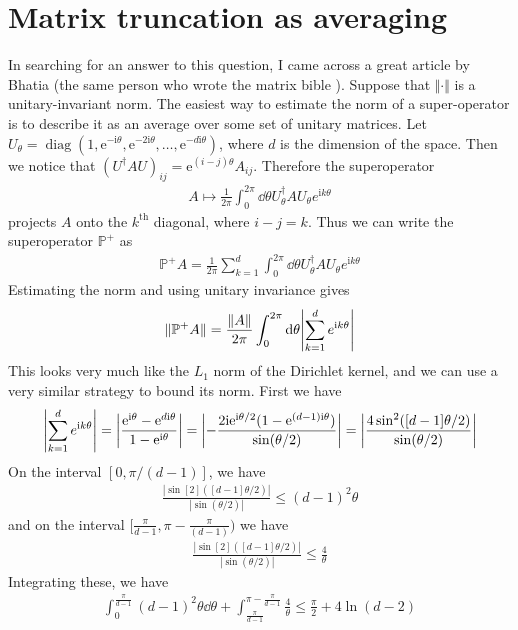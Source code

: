 \documentclass[11pt]{article}
\newcommand{\diag}{\operatorname{diag}}
\newcommand{\e}{\mathrm e}
\newcommand{\ii}{\mathrm i}
\begin{document}
\section{Matrix truncation as averaging}
In searching for an answer to this question, I came across a great article by
Bhatia \cite{bhatia} (the same person who wrote the matrix bible \cite{bible}).
Suppose that $\Vert \cdot \Vert$ is a unitary-invariant norm. The easiest way to
estimate the norm of a super-operator is to describe it as an average over some set of unitary matrices. Let $U_{\theta} = \diag(1, \e^{-\ii\theta}, \e^{-2\ii \theta}, \dots, \e^{-d\ii\theta})$, where $d$ is the dimension of the space. Then we notice that $(U^\dagger A U)_{ij} = \e^{(i-j)\theta}A_{ij}$. Therefore the superoperator
\begin{align}
    A \mapsto \frac{1}{2\pi}\int_{0}^{2\pi}\dd \theta U_{\theta}^\dagger A U_{\theta}e^{\ii k \theta}
\end{align}
projects $A$ onto the $k^{\text{th}}$ diagonal, where $i-j = k$. Thus we can write the superoperator $\mathbb P^+$ as
\begin{align}
    \mathbb P^+ A = \frac{1}{2\pi}\sum_{k = 1}^d\int_{0}^{2\pi}\dd \theta U_{\theta}^\dagger A U_{\theta}e^{\ii k \theta}
\end{align}
Estimating the norm and using unitary invariance gives
\begin{align}
    \Vert\mathbb P^+ A\Vert = \frac{\Vert A \Vert}{2\pi}\int_{0}^{2\pi}\dd \theta \qty|\sum_{k = 1}^d e^{\ii k \theta}|
\end{align}
This looks very much like the $L_1$ norm of the Dirichlet kernel, and we can use a very similar strategy to bound its norm. First we have
\begin{align}
    \qty|\sum_{k = 1}^d e^{\ii k \theta}| = \qty|\frac{\e^{\ii \theta}-\e^{d\ii\theta}}{1- \e^{\ii\theta}}| = \qty|-\frac{2\ii\e^{\ii\theta/2}( 1 - \e^{(d-1)\ii\theta})}{\sin(\theta/2)}| = \qty|\frac{4\sin[2]([d-1]\theta/2)}{\sin(\theta/2)}|
\end{align}
On the interval $[0, \pi/(d-1)]$, we have
\begin{align}
    \frac{|\sin[2]([d-1]\theta/2)|}{|\sin(\theta/2)|} \leq (d-1)^2\theta
\end{align}
and on the interval $[\frac{\pi}{d-1}, \pi - \frac{\pi}{(d-1)})$ we have 
\begin{align}
    \frac{|\sin[2]([d-1]\theta/2)|}{|\sin(\theta/2)|} \leq \frac{4}{\theta}
\end{align}
Integrating these, we have
\begin{align}
    \int_0^{\frac{\pi}{d-1}}(d-1)^2\theta \dd \theta + \int_{\frac{\pi}{d-1}}^{\pi - \frac{\pi}{d-1}}\frac{4}{\theta} \leq \frac{\pi}{2} + 4\ln(d-2)
\end{align}
\end{document}
